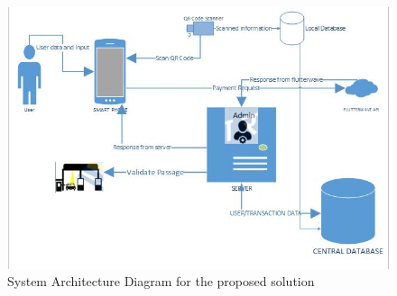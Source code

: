 \begin{figure}
    \begin{center}
        \includegraphics[scale = 0.6]{images/etolssys}
        \caption{System Architecture Diagram for the proposed solution }
    \end{center}
\end{figure}